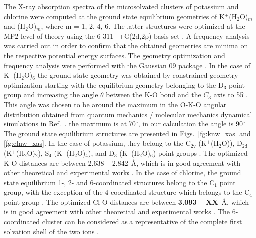 The X-ray absorption spectra of the microsolvated clusters of potassium and chlorine were computed at the ground state equilibrium geometries of K$^+$(H$_2$O)$_m$ and \cli(H$_2$O)$_m$, where m = 1, 2, 4, 6. The latter structures were optimized at the MP2 level of theory using the 6-311++G(2d,2p) basis set \citep{Krishnan80:650,Blaudeau97:5016}. A frequency analysis was carried out in order to confirm that the obtained geometries are minima on the respective potential energy surfaces. The geometry optimization and frequency analysis were performed with the Gaussian 09 package \citep{g09}. In the case of K$^{+}$(H$_2$O)$_6$ the ground state geometry was obtained by constrained geometry optimization starting with the equilibrium geometry \citep{lee99:3995} belonging to the D$_3$ point group and increasing the angle $\theta$ between the K-O bond and the $C_3$ axis to 55$^{\circ}$. This angle was chosen to be around the maximum in the O-K-O angular distribution obtained from quantum mechanics / molecular mechanics dynamical simulations in Ref.\ \citep{ma14:1006}. {\color{red} the maximum is at 70$^{\circ}$, in our calculation the angle is 90$^{\circ}$} The ground state equilibrium structures are presented in Figs.\ \ref{fg:knw_xas} and \ref{fg:clnw_xas}. In the case of potassium, they belong to the C$_{2\text{v}}$ (K$^{+}$(H$_2$O)), D$_{2\text{d}}$ (K$^{+}$(H$_2$O)$_2$), S$_4$ (K$^{+}$(H$_2$O)$_4$), and D$_3$ (K$^{+}$(H$_2$O)$_6$) point groups \citep{rao08:12944}. The optimized K-O distances are between 2.638 -- 2.842~\AA, which is in good agreement with other theoretical and experimental works \citep{Ohtaki93:1157,soper06:180,ma14:1006}. In the case of chlorine, the ground state equilibrium 1-, 2- and 6-coordinated structures belong to the C$_{1}$ point group, with the exception of the 4-coordinated structure which belongs to the C$_4$ point group \citep{gora00:7}. The optimized Cl-O distances are between {\color{red}\bf 3.093 -- XX}~\AA, which is in good agreement with other theoretical and experimental works \citep{ge13:13169,gora00:7,Ohtaki93:1157,soper06:180,ma14:1006}. The 6-coordinated cluster can be considered as a representative of the complete first solvation shell of the two ions \citep{Ohtaki93:1157,soper06:180,ma14:1006}.


